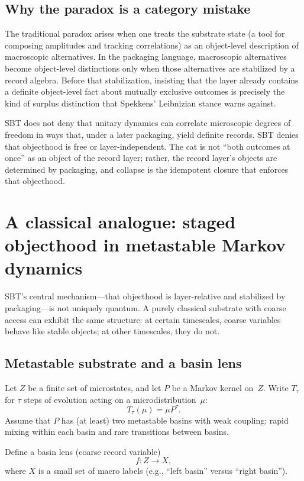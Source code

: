\documentclass[11pt]{article}
\begin{document}
\subsection{Why the paradox is a category mistake}

The traditional paradox arises when one treats the substrate state (a tool for composing amplitudes and tracking correlations) as an object-level description of macroscopic alternatives.
In the packaging language, macroscopic alternatives become object-level distinctions only when those alternatives are stabilized by a record algebra.
Before that stabilization, insisting that the layer already contains a definite object-level fact about mutually exclusive outcomes is precisely the kind of surplus distinction that Spekkens' Leibnizian stance warns against.

SBT does not deny that unitary dynamics can correlate microscopic degrees of freedom in ways that, under a later packaging, yield definite records.
SBT denies that objecthood is free or layer-independent.
The cat is not ``both outcomes at once'' as an object of the record layer; rather, the record layer's objects are determined by packaging, and collapse is the idempotent closure that enforces that objecthood.
 \section{A classical analogue: staged objecthood in metastable Markov dynamics}\label{sec:markov}

SBT's central mechanism---that objecthood is layer-relative and stabilized by packaging---is not uniquely quantum.
A purely classical substrate with coarse access can exhibit the same structure: at certain timescales, coarse variables behave like stable objects; at other timescales, they do not.

\subsection{Metastable substrate and a basin lens}

Let $Z$ be a finite set of microstates, and let $P$ be a Markov kernel on~$Z$.\cite{Norris1997}
Write $T_\tau$ for $\tau$ steps of evolution acting on a microdistribution~$\mu$:
\[
T_\tau(\mu) = \mu P^\tau.
\]
Assume that $P$ has (at least) two metastable basins with weak coupling: rapid mixing within each basin and rare transitions between basins.

Define a basin lens (coarse record variable)
\[
f : Z \to X,
\]
where $X$ is a small set of macro labels (e.g., ``left basin'' versus ``right basin'').
\end{document}
